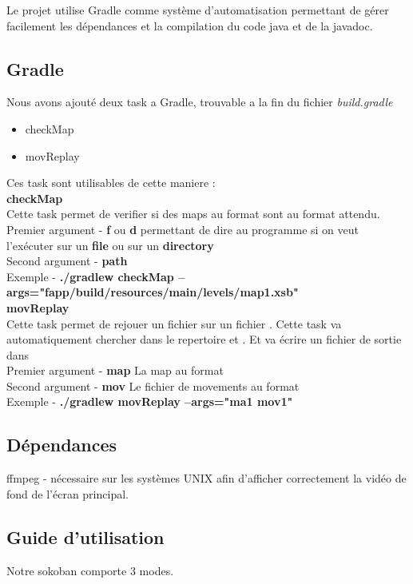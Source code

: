 \documentclass[../main.tex]{subfiles}
\begin{document}
Le projet utilise Gradle comme système d'automatisation permettant de gérer facilement les dépendances et la compilation du code java et de la javadoc.
\subsection{Gradle}
Nous avons ajouté deux task a Gradle, trouvable a la fin du fichier \textit{build.gradle}
\begin{itemize}
    \item checkMap
    \item movReplay
\end{itemize}
Ces task sont utilisables de cette maniere : \\

\textbf{checkMap} \\
Cette task permet de verifier si des maps au format  sont au format attendu. \\
Premier argument - \textbf{f} ou \textbf{d} permettant de dire au programme si on veut l'exécuter sur un \textbf{file} ou sur un \textbf{directory} \\
Second argument - \textbf{path} \\
Exemple - \textbf{./gradlew checkMap --args="fapp/build/resources/main/levels/map1.xsb"} \\

\textbf{movReplay} \\
Cette task permet de rejouer un fichier  sur un fichier . Cette task va automatiquement chercher dans le repertoire 
et . Et va écrire un fichier de sortie dans  \\
Premier argument - \textbf{map} La map au format  \\
Second argument - \textbf{mov} Le fichier de movements au format  \\
Exemple - \textbf{./gradlew movReplay --args="ma1 mov1"}

\subsection{Dépendances}
ffmpeg - nécessaire sur les systèmes UNIX afin d'afficher correctement la vidéo de fond de l'écran principal.
\subsection{Guide d'utilisation}
Notre sokoban comporte 3 modes. \\
\end{document}
